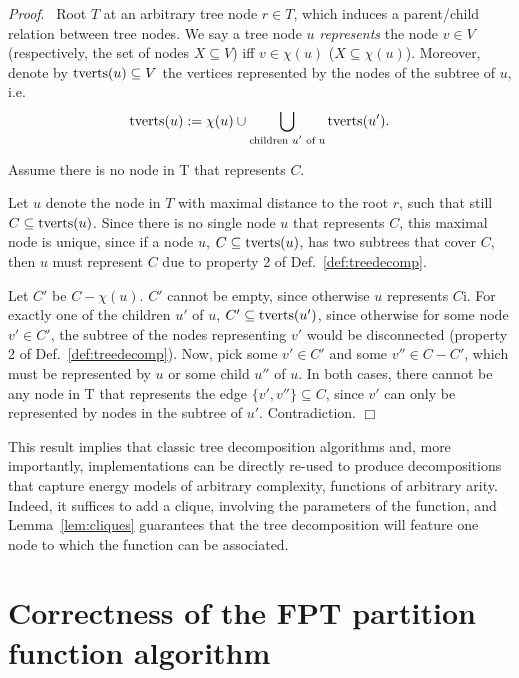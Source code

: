 \documentclass[10pt]{article}
\newenvironment{proof}[1][]{\noindent \emph{Proof}\ifthenelse{\equal{#1}{}}{}{ (#1)}.~}{\hfill$\Box$}
\begin{document}
\begin{proof}
  \newcommand{\TransVars}[1]{{\rm tverts}(#1)}%
  Root $T$ at an arbitrary tree node $r\in T$, which induces a parent/child relation between tree nodes.
  We say a tree node $u$ \emph{represents} the node $v\in V$ (respectively, the set of nodes $X\subseteq V$) iff $v\in\chi(u)$ ($X\subseteq\chi(u)$).
  Moreover, denote by $\TransVars{u}\subseteq V$ the vertices
  represented by the nodes of the subtree of $u$, i.e.
  $$\TransVars{u} := \chi(u) \cup \bigcup_{\text{children $u'$ of u}} \TransVars{u'}.$$

  Assume there is no node in T that represents $C$.

  Let $u$ denote the node in $T$ with maximal distance to the root $r$,
  such that still $C\subseteq\TransVars{u}$.
  Since there is no single node $u$ that represents $C$, this maximal node is unique, since
  if a node $u$, $C\subseteq\TransVars{u}$, has two subtrees that cover $C$, then $u$ must represent $C$ due to property 2 of Def.~\ref{def:treedecomp}. 

  Let $C'$ be $C-\chi(u)$.
  $C'$ cannot be empty, since otherwise $u$ represents $C$i.
  For exactly one of the children $u'$ of $u$,
  $C'\subseteq\TransVars{u'}$, since otherwise for
  some node $v'\in C'$, the subtree of the nodes representing $v'$ would be disconnected (property 2 of Def.~\ref{def:treedecomp}). Now, pick some $v'\in C'$ and some
  $v''\in C-C'$, which must be represented by $u$ or some child $u''$ of $u$. In both cases, there cannot
  be any node in T that represents the edge $\{v',v''\}\subseteq C$, since $v'$ can only be represented 
  by nodes in the subtree of $u'$. Contradiction.
\end{proof}


This result implies that classic tree decomposition algorithms and, more importantly, implementations can be directly re-used to produce decompositions that capture energy models of arbitrary complexity, functions of arbitrary arity. Indeed, it suffices to add a clique, involving the parameters of the function, and Lemma~\ref{lem:cliques} guarantees that the tree decomposition will feature one node to which the function can be associated.


\section{Correctness of the FPT partition function algorithm}
\label{appsec:correctness}
\end{document}
